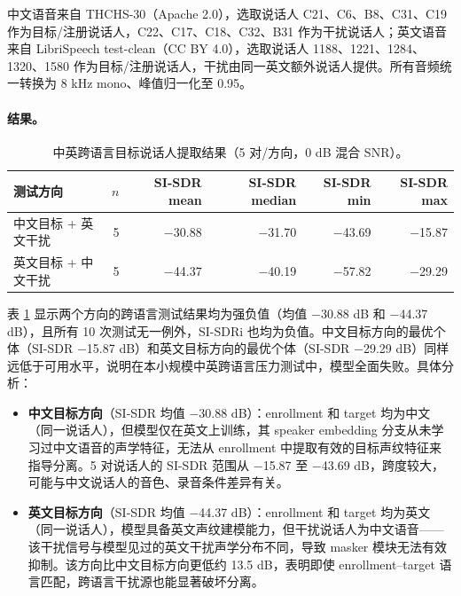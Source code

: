 \documentclass[UTF8,zihao=5,a4paper]{ctexart}
\newcommand{\sisdr}{SI-SDR}
\begin{document}
中文语音来自 THCHS-30（Apache 2.0），选取说话人 C21、C6、B8、C31、C19 作为目标/注册说话人，C22、C17、C18、C32、B31 作为干扰说话人；英文语音来自 LibriSpeech test-clean（CC BY 4.0），选取说话人 1188、1221、1284、1320、1580 作为目标/注册说话人，干扰由同一英文额外说话人提供。所有音频统一转换为 8 kHz mono、峰值归一化至 0.95。

\paragraph{结果。}

\begin{table}[H]
\centering
\begin{tabular}{lrrrrr}
\toprule
测试方向 & $n$ & \sisdr{} mean & \sisdr{} median & \sisdr{} min & \sisdr{} max \\
\midrule
中文目标 + 英文干扰 & 5 & $-$30.88 & $-$31.70 & $-$43.69 & $-$15.87 \\
英文目标 + 中文干扰 & 5 & $-$44.37 & $-$40.19 & $-$57.82 & $-$29.29 \\
\bottomrule
\end{tabular}
\caption{中英跨语言目标说话人提取结果（5 对/方向，0 dB 混合 SNR）。}
\label{tab:crosslingual}
\end{table}

表 \ref{tab:crosslingual} 显示两个方向的跨语言测试结果均为强负值（均值 $-$30.88 dB 和 $-$44.37 dB），且所有 10 次测试无一例外，\sisdr{}i 也均为负值。中文目标方向的最优个体（\sisdr{} $-$15.87 dB）和英文目标方向的最优个体（\sisdr{} $-$29.29 dB）同样远低于可用水平，说明在本小规模中英跨语言压力测试中，模型全面失败。具体分析：

\begin{itemize}
    \item \textbf{中文目标方向}（\sisdr{} 均值 $-$30.88 dB）：enrollment 和 target 均为中文（同一说话人），但模型仅在英文上训练，其 speaker embedding 分支从未学习过中文语音的声学特征，无法从 enrollment 中提取有效的目标声纹特征来指导分离。5 对说话人的 \sisdr{} 范围从 $-$15.87 至 $-$43.69 dB，跨度较大，可能与中文说话人的音色、录音条件差异有关。

    \item \textbf{英文目标方向}（\sisdr{} 均值 $-$44.37 dB）：enrollment 和 target 均为英文（同一说话人），模型具备英文声纹建模能力，但干扰说话人为中文语音——该干扰信号与模型见过的英文干扰声学分布不同，导致 masker 模块无法有效抑制。该方向比中文目标方向更低约 13.5 dB，表明即使 enrollment--target 语言匹配，跨语言干扰源也能显著破坏分离。
\end{itemize}
\end{document}

